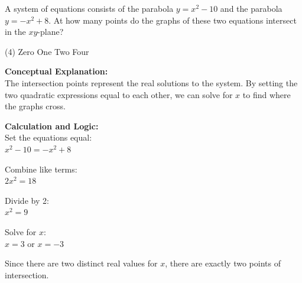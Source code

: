 \documentclass[11pt,paper=a4,answers]{exam}
\begin{document}
\begin{questions}
\pointsinrightmargin
\pointsdroppedatright
\marksnotpoints
{}
\pointformat{\boldmath\themarginpoints}
\bracketedpoints




\question
A system of equations consists of the parabola $y = x^2 - 10$ and the parabola $y = -x^2 + 8$. At how many points do the graphs of these two equations intersect in the $xy$-plane?
\begin{tasks}(4)
    \task Zero
    \task One
    \task Two
    \task Four
\end{tasks}

\begin{solution}
\textbf{Conceptual Explanation:} \\
The intersection points represent the real solutions to the system. By setting the two quadratic expressions equal to each other, we can solve for $x$ to find where the graphs cross.

\vspace{20pt}

\textbf{Calculation and Logic:} \\
Set the equations equal: \\
$x^2 - 10 = -x^2 + 8$

\vspace{10pt}

Combine like terms: \\
$2x^2 = 18$

\vspace{10pt}

Divide by 2: \\
$x^2 = 9$

\vspace{10pt}

Solve for $x$: \\
$x = 3$ or $x = -3$

\vspace{10pt}

Since there are two distinct real values for $x$, there are exactly two points of intersection.


\end{solution}
\end{questions}
\end{document}

